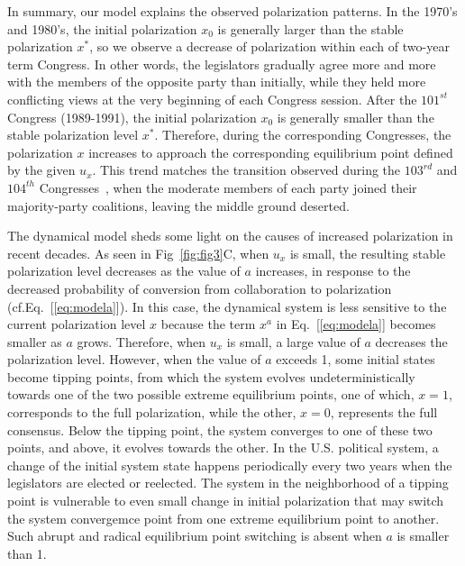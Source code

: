 In summary, our model explains the observed polarization patterns. 
In the 1970's and 1980's, the initial polarization $x_0$ is generally larger than the stable polarization $x^*$, so we observe a decrease of polarization within each of two-year term Congress. In other words, the legislators  gradually agree more and more with the members of the opposite party than initially, while they held more conflicting views at the very beginning of each Congress session. After the $101^{st}$ Congress (1989-1991), the initial polarization $x_0$ is generally smaller than the stable polarization level $x^*$. Therefore, during the corresponding Congresses, the polarization $x$ increases to approach the corresponding equilibrium point defined by the given $u_x$. This trend matches the transition observed during the $103^{rd}$ and $104^{th}$ Congresses~\cite{moody2013portrait}, when the 
moderate members of each party joined their majority-party coalitions, leaving the middle ground deserted.

The dynamical model sheds some light on the causes of increased polarization in recent decades. As seen in Fig~\ref{fig:fig3}C, when $u_x$ is small, the 
resulting stable polarization level decreases as the value of $a$ increases, in response to the decreased probability of conversion from collaboration to 
polarization (cf.Eq.~[\ref{eq:modela}]). In this case, the dynamical system is less sensitive to the current polarization level $x$ because the term $x^a$ 
in Eq.~[\ref{eq:modela}] becomes smaller as $a$ grows. Therefore, when $u_x$ is small, a large value of $a$ decreases the polarization level. However, when 
the value of $a$ exceeds 1, some initial states become tipping points, from which the system evolves undeterministically towards one of the two possible 
extreme equilibrium points, one of which,  $x=1$, corresponds to the full polarization, while the other, $x=0$, represents the full consensus. Below the 
tipping point, the system converges to one of these two points, and above, it evolves towards the other. 
In the U.S. political system, a change of the initial system state happens periodically every two years when the legislators are elected or reelected. The 
system in the neighborhood of a tipping point is  vulnerable to even small change in initial polarization that may switch the system convergemce point
from one extreme equilibrium point to another. Such abrupt and radical equilibrium point switching is absent when $a$ is smaller than 1.


